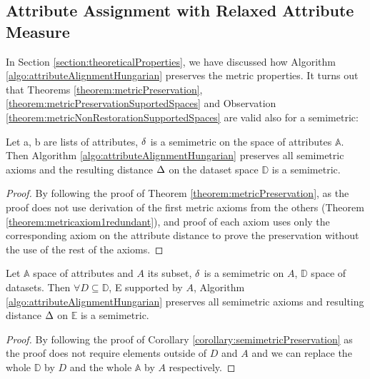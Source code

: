 \subsection{Attribute Assignment with Relaxed Attribute Measure}
In Section \ref{section:theoreticalProperties}, we have discussed how Algorithm \ref{algo:attributeAlignmentHungarian} preserves the metric properties. It turns out that Theorems \ref{theorem:metricPreservation}, \ref{theorem:metricPreservationSuportedSpaces} and Observation \ref{theorem:metricNonRestorationSupportedSpaces} are valid also for a semimetric:
\begin{corollary}
	\label{corollary:semimetricPreservation}
	Let a, b are lists of attributes, $\delta$ is a semimetric on the space of attributes $\mathbb{A}$. Then Algorithm \ref{algo:attributeAlignmentHungarian} preserves all semimetric axioms and the resulting distance $\Delta$ on the dataset space $\mathbb{D}$ is a semimetric.
	\begin{proof}	
	By following the proof of Theorem \ref{theorem:metricPreservation}, as the proof does not use derivation of the first metric axioms from the others (Theorem \ref{theorem:metricaxiom1redundant}), and proof of each axiom uses only the corresponding axiom on the attribute distance to prove the preservation without the use of the rest of the axioms.
	\end{proof}
\end{corollary}

\begin{corollary}
	\label{corollary:semimetricPreservationSuportedSpaces}
	Let $\mathbb{A}$ space of attributes and $A$ its subset, $\delta$ is a semimetric on $A$, $\mathbb{D}$ space of datasets. Then $\forall D \subseteq \mathbb{D}$, E supported by $A$, Algorithm \ref{algo:attributeAlignmentHungarian} preserves all semimetric axioms and resulting distance $\Delta$ on $\mathbb{E}$ is a semimetric.
	\begin{proof}
	By following the proof of Corollary \ref{corollary:semimetricPreservation} as the proof does not require elements outside of $D$ and $A$ and we can replace the whole $\mathbb{D}$ by $D$ and the whole $\mathbb{A}$ by $A$ respectively.	
	\end{proof}
\end{corollary}

